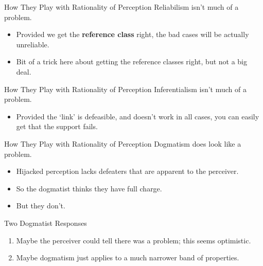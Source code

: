 \documentclass[
  17pt,
  letterpaper,
  ignorenonframetext,
  aspectratio=169,
  xcolor={dvipsnames}]{beamer}
\providecommand{\tightlist}{%
  \setlength{\itemsep}{0pt}\setlength{\parskip}{0pt}}\usepackage{longtable,booktabs,array}
\begin{document}
\begin{frame}{How They Play with Rationality of Perception}
\protect\hypertarget{how-they-play-with-rationality-of-perception-2}{}
Reliabilism isn't much of a problem.

\begin{itemize}[<+->]
\tightlist
\item
  Provided we get the \textbf{reference class} right, the bad cases will
  be actually unreliable.
\item
  Bit of a trick here about getting the reference classes right, but not
  a big deal.
\end{itemize}
\end{frame}

\begin{frame}{How They Play with Rationality of Perception}
\protect\hypertarget{how-they-play-with-rationality-of-perception-3}{}
Inferentialism isn't much of a problem.

\begin{itemize}[<+->]
\tightlist
\item
  Provided the `link' is defeasible, and doesn't work in all cases, you
  can easily get that the support fails.
\end{itemize}
\end{frame}

\begin{frame}{How They Play with Rationality of Perception}
\protect\hypertarget{how-they-play-with-rationality-of-perception-4}{}
Dogmatism does look like a problem.

\begin{itemize}[<+->]
\tightlist
\item
  Hijacked perception lacks defeaters that are apparent to the
  perceiver.
\item
  So the dogmatist thinks they have full charge.
\item
  But they don't.
\end{itemize}
\end{frame}

\begin{frame}{Two Dogmatist Responses}
\protect\hypertarget{two-dogmatist-responses}{}
\begin{enumerate}[<+->]
\tightlist
\item
  Maybe the perceiver could tell there was a problem; this seems
  optimistic.
\item
  Maybe dogmatism just applies to a much narrower band of properties.
\end{enumerate}
\end{frame}
\end{document}
